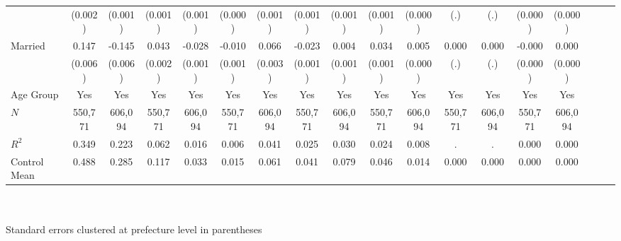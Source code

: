 \documentclass[a4paper,12pt]{article}
\begin{document}
\begin{table}[htbp]
{\begin{tabular}{@{}l*{17}{c}@{}}
          &  (0.002)         &  (0.001)         &  (0.001)         &  (0.001)         &  (0.000)         &  (0.001)         &  (0.001)         &  (0.001)         &  (0.001)         &  (0.000)         &      (.)         &      (.)         &  (0.000)         &  (0.000)         \\
\addlinespace
Married   &    0.147\sym{***}&   -0.145\sym{***}&    0.043\sym{***}&   -0.028\sym{***}&   -0.010\sym{***}&    0.066\sym{***}&   -0.023\sym{***}&    0.004\sym{***}&    0.034\sym{***}&    0.005\sym{***}&    0.000         &    0.000         &   -0.000         &    0.000         \\
          &  (0.006)         &  (0.006)         &  (0.002)         &  (0.001)         &  (0.001)         &  (0.003)         &  (0.001)         &  (0.001)         &  (0.001)         &  (0.000)         &      (.)         &      (.)         &  (0.000)         &  (0.000)         \\
\addlinespace
Age Group &      Yes         &      Yes         &      Yes         &      Yes         &      Yes         &      Yes         &      Yes         &      Yes         &      Yes         &      Yes         &      Yes         &      Yes         &      Yes         &      Yes         \\
\midrule
$\textit{N}$&  550,771         &  606,094         &  550,771         &  606,094         &  550,771         &  606,094         &  550,771         &  606,094         &  550,771         &  606,094         &  550,771         &  606,094         &  550,771         &  606,094         \\
$\textit{R}^2$&    0.349         &    0.223         &    0.062         &    0.016         &    0.006         &    0.041         &    0.025         &    0.030         &    0.024         &    0.008         &        .         &        .         &    0.000         &    0.000         \\
Control Mean&    0.488         &    0.285         &    0.117         &    0.033         &    0.015         &    0.061         &    0.041         &    0.079         &    0.046         &    0.014         &    0.000         &    0.000         &    0.000         &    0.000         \\
\bottomrule
\end{tabular}}
\raggedright
\\\\{\linewidth}{\tiny Standard errors clustered at prefecture level in parentheses}\\\\

\end{table}
\end{document}
